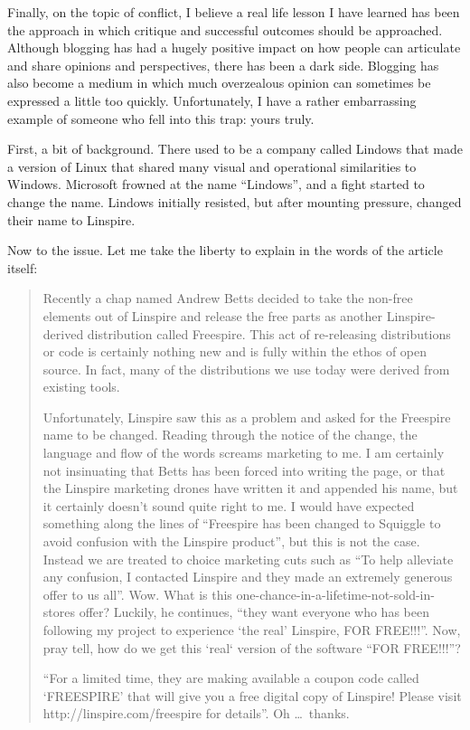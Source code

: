 Finally, on the topic of conflict, I believe a real life lesson I have learned
has been the approach in which critique and successful outcomes should be
approached. Although blogging has had a hugely positive impact on how people can
articulate and share opinions and perspectives, there has been a dark side.
Blogging has also become a medium in which much overzealous opinion can
sometimes be expressed a little too quickly. Unfortunately, I have a rather
embarrassing example of someone who fell into this trap: yours truly.

First, a bit of background. There used to be a company called Lindows that made
a version of Linux that shared many visual and operational similarities to
Windows. Microsoft frowned at the name ``Lindows'', and a fight started to
change the name. Lindows initially resisted, but after mounting pressure,
changed their name to Linspire.

Now to the issue. Let me take the liberty to explain in the words of the article
itself:
\begin{quote}
 Recently a chap named Andrew Betts decided to take the non-free elements out of
Linspire and release the free parts as another Linspire-derived distribution
called Freespire. This act of re-releasing distributions or code is certainly
nothing new and is fully within the ethos of open source. In fact, many of the
distributions we use today were derived from existing tools.

Unfortunately, Linspire saw this as a problem and asked for the Freespire name
to be changed. Reading through the notice of the change, the language and flow
of the words screams marketing to me. I am certainly not insinuating that Betts
has been forced into writing the page, or that the Linspire marketing drones
have written it and appended his name, but it certainly doesn’t sound quite
right to me. I would have expected something along the lines of ``Freespire has
been changed to Squiggle to avoid confusion with the Linspire product'', but
this is not the case. Instead we are treated to choice marketing cuts such as
``To help alleviate any confusion, I contacted Linspire and they made an
extremely generous offer to us all''. Wow. What is this
one-chance-in-a-lifetime-not-sold-in-stores offer? Luckily, he continues, ``they
want everyone who has been following my project to experience ‘the real’
Linspire, FOR FREE!!!''. Now, pray tell, how do we get this ‘real‘ version of
the software ``FOR FREE!!!''?

``For a limited time, they are making available a coupon code called ‘FREESPIRE’
that will give you a free digital copy of Linspire! Please visit
http://linspire.com/freespire for details''. Oh \dots\ thanks.
\end{quote}

